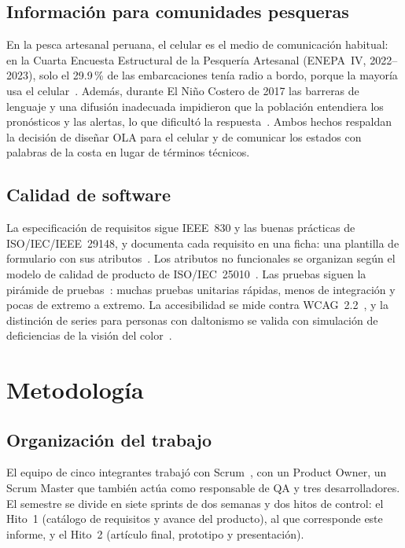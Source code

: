 \documentclass[conference,a4paper]{IEEEtran}
\begin{document}
\subsection{Información para comunidades pesqueras}
En la pesca artesanal peruana, el celular es el medio de comunicación habitual: en la Cuarta Encuesta Estructural de la Pesquería Artesanal (ENEPA~IV, 2022--2023), solo el 29.9\,\% de las embarcaciones tenía radio a bordo, porque la mayoría usa el celular~\cite{enepa2025}. Además, durante El Niño Costero de 2017 las barreras de lenguaje y una difusión inadecuada impidieron que la población entendiera los pronósticos y las alertas, lo que dificultó la respuesta~\cite{yglesias2023}. Ambos hechos respaldan la decisión de diseñar OLA para el celular y de comunicar los estados con palabras de la costa en lugar de términos técnicos.

\subsection{Calidad de software}
La especificación de requisitos sigue IEEE~830 y las buenas prácticas de ISO/IEC/IEEE~29148, y documenta cada requisito en una ficha: una plantilla de formulario con sus atributos~\cite{ireb2024}. Los atributos no funcionales se organizan según el modelo de calidad de producto de ISO/IEC~25010~\cite{iso25010}. Las pruebas siguen la pirámide de pruebas~\cite{istqb2024}: muchas pruebas unitarias rápidas, menos de integración y pocas de extremo a extremo. La accesibilidad se mide contra WCAG~2.2~\cite{wcag22}, y la distinción de series para personas con daltonismo se valida con simulación de deficiencias de la visión del color~\cite{jamil2024}.

\section{Metodología}\label{sec:metodo}

\subsection{Organización del trabajo}
El equipo de cinco integrantes trabajó con Scrum~\cite{scrum2025}, con un Product Owner, un Scrum Master que también actúa como responsable de QA y tres desarrolladores. El semestre se divide en siete sprints de dos semanas y dos hitos de control: el Hito~1 (catálogo de requisitos y avance del producto), al que corresponde este informe, y el Hito~2 (artículo final, prototipo y presentación).
\end{document}
